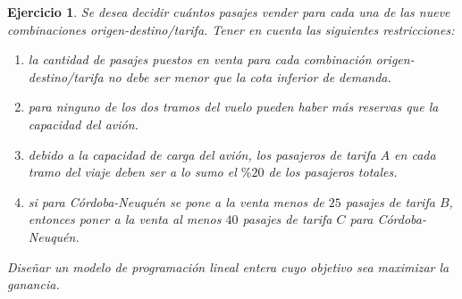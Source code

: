 \documentclass[a4paper,oneside,12pt]{amsart}
\newtheorem{quest}{Ejercicio}
\begin{document}
\begin{quest}
    Se desea decidir cuántos pasajes vender para cada una de las nueve combinaciones origen-destino/tarifa. Tener en cuenta las siguientes restricciones:
    \begin{enumerate}
        \item la cantidad de pasajes puestos en venta para cada combinación origen-destino/tarifa no debe ser menor que la cota inferior de demanda.
        \item para ninguno de los dos tramos del vuelo pueden haber más reservas que la capacidad del avión.
        \item debido a la capacidad de carga del avión, los pasajeros de tarifa $A$ en cada tramo del viaje deben ser a lo sumo el $\%20$ de los pasajeros totales.
        \item si para Córdoba-Neuquén se pone a la venta menos de $25$ pasajes de tarifa $B$, entonces poner a la venta al menos $40$ pasajes de tarifa $C$ para Córdoba-Neuquén.
    \end{enumerate}
    Diseñar un modelo de programación lineal entera cuyo objetivo sea maximizar la ganancia.
\end{quest}

\end{document}

